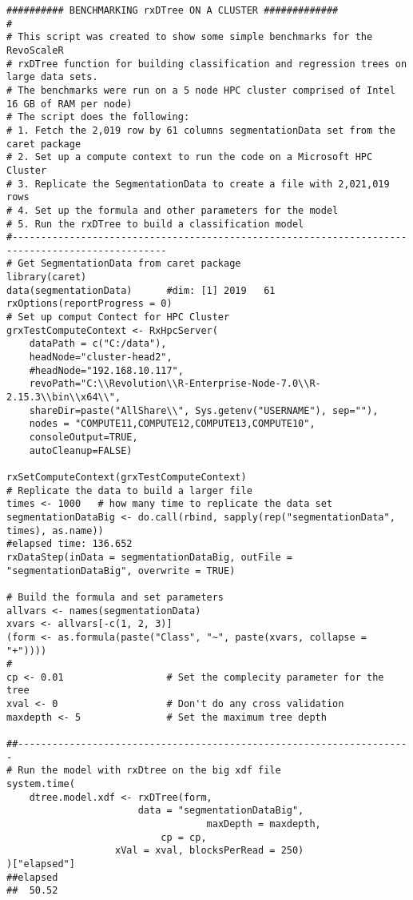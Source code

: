 \begin{framed}
\begin{verbatim}
########## BENCHMARKING rxDTree ON A CLUSTER #############
#
# This script was created to show some simple benchmarks for the RevoScaleR
# rxDTree function for building classification and regression trees on large data sets.
# The benchmarks were run on a 5 node HPC cluster comprised of Intel 16 GB of RAM per node)
# The script does the following:
# 1. Fetch the 2,019 row by 61 columns segmentationData set from the caret package
# 2. Set up a compute context to run the code on a Microsoft HPC Cluster
# 3. Replicate the SegmentationData to create a file with 2,021,019 rows
# 4. Set up the formula and other parameters for the model
# 5. Run the rxDTree to build a classification model
#-------------------------------------------------------------------------------------------------
# Get SegmentationData from caret package
library(caret)
data(segmentationData)		#dim: [1] 2019   61
rxOptions(reportProgress = 0)
# Set up comput Contect for HPC Cluster
grxTestComputeContext <- RxHpcServer( 
    dataPath = c("C:/data"), 
    headNode="cluster-head2", 
    #headNode="192.168.10.117",
    revoPath="C:\\Revolution\\R-Enterprise-Node-7.0\\R-2.15.3\\bin\\x64\\", 
    shareDir=paste("AllShare\\", Sys.getenv("USERNAME"), sep=""), 
    nodes = "COMPUTE11,COMPUTE12,COMPUTE13,COMPUTE10", 
    consoleOutput=TRUE, 
    autoCleanup=FALSE) 
 
rxSetComputeContext(grxTestComputeContext)
# Replicate the data to build a larger file
times <- 1000	# how many time to replicate the data set
segmentationDataBig <- do.call(rbind, sapply(rep("segmentationData", times), as.name))	
#elapsed time: 136.652
rxDataStep(inData = segmentationDataBig, outFile = "segmentationDataBig", overwrite = TRUE)
 
# Build the formula and set parameters
allvars <- names(segmentationData)
xvars <- allvars[-c(1, 2, 3)]
(form <- as.formula(paste("Class", "~", paste(xvars, collapse = "+"))))
#
cp <- 0.01					# Set the complecity parameter for the tree
xval <- 0					# Don't do any cross validation
maxdepth <- 5				# Set the maximum tree depth
 
##---------------------------------------------------------------------
# Run the model with rxDtree on the big xdf file
system.time(
	dtree.model.xdf <- rxDTree(form, 
			           data = "segmentationDataBig",
                                   maxDepth = maxdepth, 
		                   cp = cp, 
				   xVal = xval, blocksPerRead = 250)
)["elapsed"]
##elapsed 
##  50.52
\end{verbatim}
\end{framed}

